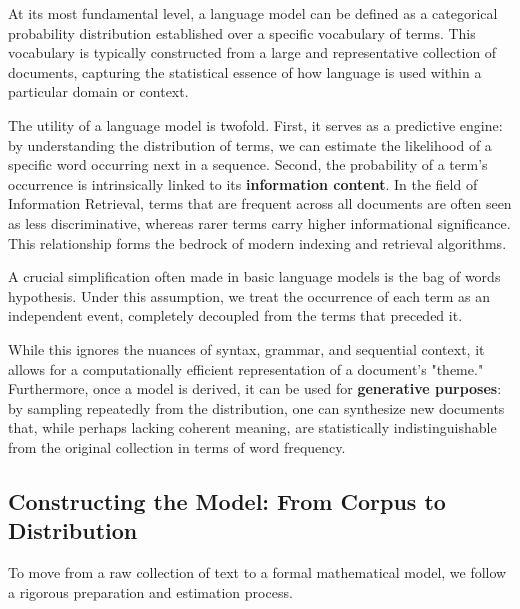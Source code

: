 At its most fundamental level, a \alert{language model} can be defined as a categorical probability distribution established over a specific vocabulary of terms. This vocabulary is typically constructed from a large and representative collection of documents, capturing the statistical essence of how language is used within a particular domain or context.

The utility of a language model is twofold. First, it serves as a predictive engine: by understanding the distribution of terms, we can estimate the likelihood of a specific word occurring next in a sequence. Second, the probability of a term's occurrence is intrinsically linked to its \textbf{information content}. In the field of Information Retrieval, terms that are frequent across all documents are often seen as less discriminative, whereas rarer terms carry higher informational significance. This relationship forms the bedrock of modern indexing and retrieval algorithms.


A crucial simplification often made in basic language models is the \alert{bag of words} hypothesis. Under this assumption, we treat the occurrence of each term as an independent event, completely decoupled from the terms that preceded it.



While this ignores the nuances of syntax, grammar, and sequential context, it allows for a computationally efficient representation of a document's "theme." Furthermore, once a model is derived, it can be used for \textbf{generative purposes}: by sampling repeatedly from the distribution, one can synthesize new documents that, while perhaps lacking coherent meaning, are statistically indistinguishable from the original collection in terms of word frequency.

\subsection*{Constructing the Model: From Corpus to Distribution}

To move from a raw collection of text to a formal mathematical model, we follow a rigorous preparation and estimation process.

